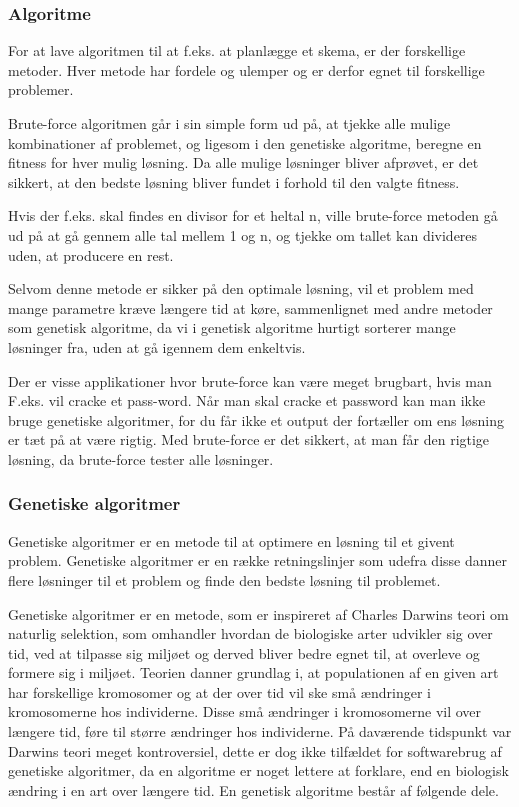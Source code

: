 \subsubsection{Algoritme}

For at lave algoritmen til at f.eks. at planlægge et skema, er der forskellige metoder. Hver metode har fordele og ulemper og er derfor egnet til forskellige problemer.


Brute-force algoritmen går i sin simple form ud på, at tjekke alle mulige kombinationer af problemet, og ligesom i den genetiske algoritme, beregne en fitness for hver mulig løsning. Da alle mulige løsninger bliver afprøvet, er det sikkert, at den bedste løsning bliver fundet i forhold til den valgte fitness. 

Hvis der f.eks. skal findes en divisor for et heltal n, ville brute-force metoden gå ud på at gå gennem alle tal mellem 1 og n, og tjekke om tallet kan divideres uden, at producere en rest.

Selvom denne metode er sikker på den optimale løsning, vil et problem med mange parametre kræve længere tid at køre, sammenlignet med andre metoder som genetisk algoritme, da vi i genetisk algoritme hurtigt sorterer mange løsninger fra, uden at gå igennem dem enkeltvis.

Der er visse applikationer hvor brute-force kan være meget brugbart, hvis man F.eks. vil cracke et pass-word. Når man skal cracke et password kan man ikke bruge genetiske algoritmer, for du får ikke et output der fortæller om ens løsning er tæt på at være rigtig. Med brute-force er det sikkert, at man får den rigtige løsning, da brute-force tester alle løsninger.

\subsubsection{Genetiske algoritmer}
Genetiske algoritmer er en metode til at optimere en løsning til et givent problem. Genetiske algoritmer er en række retningslinjer som udefra disse danner flere løsninger til et problem og finde den bedste løsning til problemet.

Genetiske algoritmer er en metode, som er inspireret af Charles Darwins teori om naturlig selektion, som omhandler hvordan de biologiske arter udvikler sig over tid, ved at tilpasse sig miljøet og derved bliver bedre egnet til, at overleve og formere sig i miljøet. Teorien danner grundlag i, at populationen af en given art har forskellige kromosomer og at der over tid vil ske små ændringer i kromosomerne hos individerne. Disse små ændringer i kromosomerne vil over længere tid, føre til større ændringer hos individerne. På daværende tidspunkt var Darwins teori meget kontroversiel, dette er dog ikke tilfældet for softwarebrug af genetiske algoritmer, da en algoritme er noget lettere at forklare, end en biologisk ændring i en art over længere tid.
En genetisk algoritme består af følgende dele.

